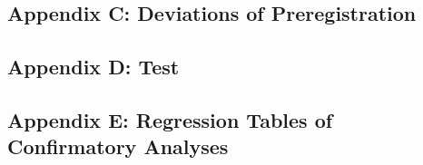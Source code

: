\documentclass[
  12pt,
]{scrartcl}
\begin{document}
\subsection{Appendix C: Deviations of
Preregistration}\label{appendix-c-deviations-of-preregistration}

\subsection{Appendix D: Test}\label{appendix-d-test}

\begin{table}[H]
\centering
\caption{\label{tab:unnamed-chunk-42}Estimated Parameters for the Distribution of Effect Size and Sample Size from each Meta-Analysis via ML}
\centering
{}
\end{table}

\subsection{Appendix E: Regression Tables of Confirmatory
Analyses}\label{appendix-e-regression-tables-of-confirmatory-analyses}
\end{document}
